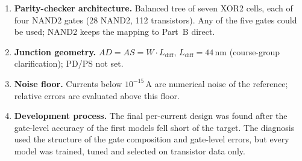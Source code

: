 \begin{enumerate}
  \item \textbf{Parity-checker architecture.} Balanced tree of seven XOR2 cells, each of four NAND2 gates (28 NAND2, 112 transistors). Any of the five
        gates could be used; NAND2 keeps the mapping to Part~B direct.
  \item \textbf{Junction geometry.} $AD=AS=W\cdot L_{\mathrm{diff}}$, $L_{\mathrm{diff}}=44\,\mathrm{nm}$ (course-group clarification); PD/PS not set.
  \item \textbf{Noise floor.} Currents below $10^{-15}$\,A are numerical noise of the reference; relative errors are evaluated above this floor.
  \item \textbf{Development process.} The final per-current design was found after the gate-level accuracy of the first models fell short of the
        target. The diagnosis used the structure of the gate composition and gate-level errors, but every model was trained, tuned and selected on
        transistor data only.
\end{enumerate}
